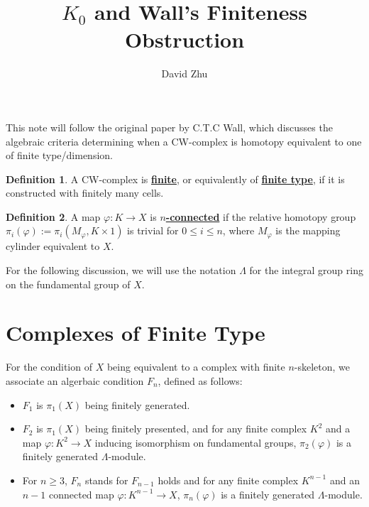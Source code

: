 \documentclass{article}
\title{$K_0$ and Wall's Finiteness Obstruction}
\author{David Zhu}
\theoremstyle{definition}
\theoremstyle{definition}
\newtheorem{definition}{Definition}[theorem]
\theoremstyle{definition}
\theoremstyle{definition}
\theoremstyle{definition}
\theoremstyle{definition}
\theoremstyle{definition}
\begin{document}
\maketitle

This note will follow the original paper by C.T.C Wall, which discusses the algebraic criteria determining when a CW-complex is homotopy equivalent to one of finite type/dimension.


\begin{tcolorbox}[colback=purple!5!white,colframe=purple!75!black]
\begin{definition}
A CW-complex is \underline{\textbf{finite}}, or equivalently of \underline{\textbf{finite type}}, if it is constructed with finitely many cells. 
\end{definition}
\end{tcolorbox}



\begin{tcolorbox}[colback=purple!5!white,colframe=purple!75!black]
\begin{definition}
A map $\varphi: K\to X$ is $n$\underline{\textbf{-connected}} if the relative homotopy group $\pi_i(\varphi):= \pi_i(M_{\varphi},K\times 1)$ is trivial for $0\leq i\leq n$, where $M_{\varphi}$ is the mapping cylinder equivalent to $X$.
\end{definition}
\end{tcolorbox}

For the following discussion, we will use the notation $\Lambda$ for the integral group ring on the fundamental group of $X$.
\section{Complexes of Finite Type}
For the condition of $X$ being equivalent to a complex with finite $n$-skeleton, we associate an algerbaic condition $F_n$, defined as follows: 

\begin{itemize}
    \item $F_1$ is $\pi_1(X)$ being finitely generated.
    \item $F_2$ is $\pi_1(X)$ being finitely presented, and for any finite complex $K^2$ and a map $\varphi: K^2\to X$ inducing isomorphism on fundamental groups, $\pi_2(\varphi)$ is a finitely generated $\Lambda$-module. 
    \item  For $n\geq 3$, $F_n$ stands for $F_{n-1}$ holds and for any finite complex $K^{n-1}$ and an $n-1$ connected map $\varphi: K^{n-1}\to X$, $\pi_n(\varphi)$ is a finitely generated $\Lambda$-module.
\end{itemize}
\end{document}
